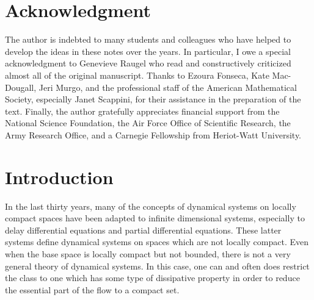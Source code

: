 \documentclass{surv-l}
\theoremstyle{plain}
\theoremstyle{definition}
\numberwithin{equation}{section}
\numberwithin{figure}{chapter}
\begin{document}

\frontmatter

\tableofcontents

\chapter*{Acknowledgment}

The author is indebted to many students and colleagues who have helped to develop the ideas in these notes over the years. In particular, I owe a special acknowledgment to Genevieve Raugel who read and constructively criticized
almost all of the original manuscript. Thanks to Ezoura Fonseca, Kate
Mac-Dougall, Jeri Murgo, and the professional staff of the American Mathematical Society, especially Janet Scappini, for their assistance in the preparation of the text.
Finally, the author gratefully appreciates financial support from the National Science Foundation, the Air Force Office of Scientific Research, the Army Research Office, and a Carnegie Fellowship from Heriot-Watt University.


\mainmatter

\chapter{Introduction}\label{chap01}
In the last thirty years, many of the concepts of dynamical systems on locally compact spaces have been adapted to infinite dimensional systems, especially to delay differential equations and partial differential equations. These latter systems define dynamical systems on spaces which are not locally compact. Even when the base space is locally compact but not bounded, there is not a very general theory of dynamical systems. In this case, one can and often does restrict the class to one which has some type of dissipative property in order to reduce the essential part of the flow to a compact set.
\end{document}
